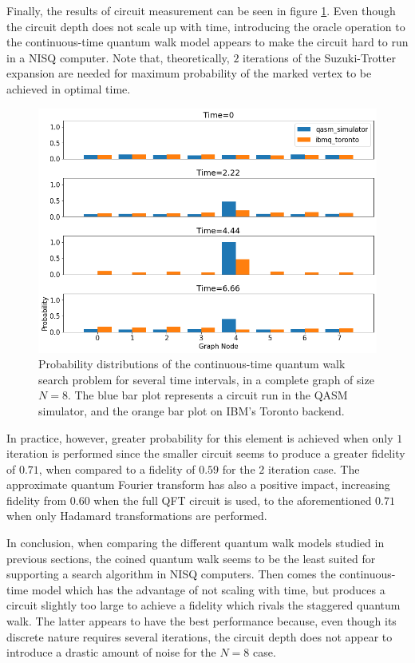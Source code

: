 \documentclass[../../dissertation.tex]{subfiles}
\begin{document}
Finally, the results of circuit measurement can be seen in figure
\ref{fig:contSearchResultCircQistkit}. Even though the circuit depth does not
scale up with time, introducing the oracle operation to the continuous-time
quantum walk model appears to make the circuit hard to run in a NISQ computer.
Note that, theoretically, $2$ iterations of the Suzuki-Trotter expansion are
needed for maximum probability of the marked vertex to be achieved in optimal
time. 
\begin{figure}[!h]
	\centering
	\includegraphics[scale=0.40]{img/Qiskit/ContQuantumWalk/Search/ContQW_N3_S2.png}
	\caption{Probability distributions of the continuous-time quantum walk search problem for several time intervals, in a complete graph of size $N=8$. The blue bar plot represents a circuit run in the QASM simulator, and the orange bar plot on IBM's Toronto backend.}
	\label{fig:contSearchResultCircQistkit}
\end{figure}
In practice, however, greater probability for this element is achieved when
only $1$ iteration is performed since the smaller circuit seems to produce a
greater fidelity of $0.71$, when compared to a fidelity of $0.59$ for the $2$
iteration case. The approximate quantum Fourier transform has also a positive
impact, increasing fidelity from $0.60$ when the full QFT circuit is used, to
the aforementioned $0.71$ when only Hadamard transformations are performed.\par

In conclusion, when comparing the different quantum walk models studied in
previous sections, the coined quantum walk seems to be the least suited for
supporting a search algorithm in NISQ computers. Then comes the continuous-time
model which has the advantage of not scaling with time, but produces a circuit
slightly too large to achieve a fidelity which rivals the staggered quantum
walk. The latter appears to have the best performance because, even though its discrete
nature requires several iterations, the circuit depth does not appear to
introduce a drastic amount of noise for the $N=8$ case. 
\end{document}

